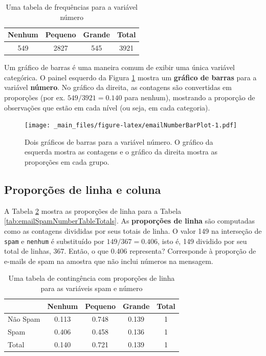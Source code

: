 \documentclass[
]{book}
\theoremstyle{definition}
\theoremstyle{definition}
\theoremstyle{definition}
\theoremstyle{definition}
\theoremstyle{remark}
\begin{document}
\begin{table}

\caption{\label{tab:emailNumberTable}Uma tabela de frequências para a variável número}
\centering
\begin{tabular}[t]{c|c|c|c}
\hline
Nenhum & Pequeno & Grande & Total\\
\hline
549 & 2827 & 545 & 3921\\
\hline
\end{tabular}
\end{table}

Um gráfico de barras é uma maneira comum de exibir uma única variável categórica. O painel esquerdo da Figura \ref{fig:emailNumberBarPlot} mostra um \textbf{gráfico de barras} para a variável \textbf{número}. No gráfico da direita, as contagens são convertidas em proporções (por ex. \(549/3921=0.140\) para nenhum), mostrando a proporção de observações que estão em cada nível (ou seja, em cada categoria).

\begin{figure}
\centering
\texttt{[image: \_main\_files/figure-latex/emailNumberBarPlot-1.pdf]}
\caption{\label{fig:emailNumberBarPlot}Dois gráficos de barras para a variável número. O gráfico da esquerda mostra as contagens e o gráfico da direita mostra as proporções em cada grupo.}
\end{figure}

\hypertarget{rowColumnProportion}{%
\subsection{Proporções de linha e coluna}\label{rowColumnProportion}}

A Tabela \ref{tab:rowPropSpamNumber} mostra as proporções de linha para a Tabela \ref{tab:emailSpamNumberTableTotals}. As \textbf{proporções de linha} são computadas como as contagens divididas por seus totais de linha. O valor 149 na interseção de \texttt{spam} e \texttt{nenhum} é substituído por \(149/367=0.406\), isto é, 149 dividido por seu total de linhas, 367. Então, o que 0.406 representa? Corresponde à proporção de e-mails de spam na amostra que não inclui números na mensagem.

\begin{table}

\caption{\label{tab:rowPropSpamNumber}Uma tabela de contingência com proporções de linha para as variáveis spam e número}
\centering
\begin{tabular}[t]{l|c|c|c|c}
\hline
  & Nenhum & Pequeno & Grande & Total\\
\hline
Não Spam & 0.113 & 0.748 & 0.139 & 1\\
\hline
Spam & 0.406 & 0.458 & 0.136 & 1\\
\hline
Total & 0.140 & 0.721 & 0.139 & 1\\
\hline
\end{tabular}
\end{table}
\end{document}
